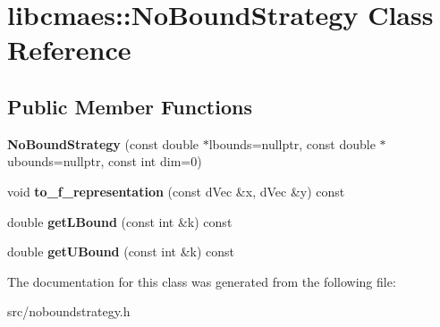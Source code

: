 \hypertarget{classlibcmaes_1_1NoBoundStrategy}{\section{libcmaes\-:\-:No\-Bound\-Strategy Class Reference}
\label{classlibcmaes_1_1NoBoundStrategy}
}
\subsection*{Public Member Functions}
\begin{DoxyCompactItemize}
\item 
\hypertarget{classlibcmaes_1_1NoBoundStrategy_a726bc7b1e9f5dbde5ad97757ed94e470}{{\bfseries No\-Bound\-Strategy} (const double $\ast$lbounds=nullptr, const double $\ast$ubounds=nullptr, const int dim=0)}\label{classlibcmaes_1_1NoBoundStrategy_a726bc7b1e9f5dbde5ad97757ed94e470}

\item 
\hypertarget{classlibcmaes_1_1NoBoundStrategy_a766c30a177076c46b89be463ce1f3062}{void {\bfseries to\-\_\-f\-\_\-representation} (const d\-Vec \&x, d\-Vec \&y) const }\label{classlibcmaes_1_1NoBoundStrategy_a766c30a177076c46b89be463ce1f3062}

\item 
\hypertarget{classlibcmaes_1_1NoBoundStrategy_a9f2fe5e1b64188118add2e8e00603ba3}{double {\bfseries get\-L\-Bound} (const int \&k) const }\label{classlibcmaes_1_1NoBoundStrategy_a9f2fe5e1b64188118add2e8e00603ba3}

\item 
\hypertarget{classlibcmaes_1_1NoBoundStrategy_a2a0a9467aeb6b57749cc73499bf40620}{double {\bfseries get\-U\-Bound} (const int \&k) const }\label{classlibcmaes_1_1NoBoundStrategy_a2a0a9467aeb6b57749cc73499bf40620}

\end{DoxyCompactItemize}


The documentation for this class was generated from the following file\-:\begin{DoxyCompactItemize}
\item 
src/noboundstrategy.\-h\end{DoxyCompactItemize}
